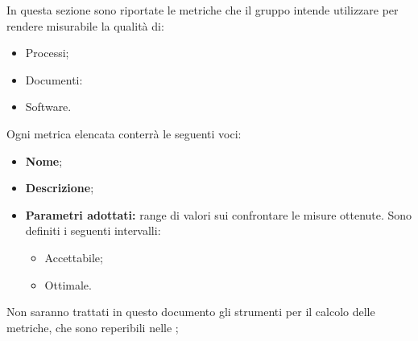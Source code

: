 In questa sezione sono riportate le metriche che il gruppo \gruppo \space intende utilizzare per rendere misurabile la qualità di:
\begin{itemize}
	\item Processi;
	\item Documenti:
	\item Software.
\end{itemize}

Ogni metrica elencata conterrà le seguenti voci:
\begin{itemize}
	\item \textbf{Nome};
	\item \textbf{Descrizione};
	\item \textbf{Parametri adottati: }range di valori sui confrontare le misure ottenute. Sono definiti i seguenti intervalli:
	\begin{itemize}
		\item Accettabile;
		\item Ottimale.
	\end{itemize}		

\end{itemize}

Non saranno trattati in questo documento gli strumenti per il calcolo delle metriche, che sono reperibili nelle \NdP ;